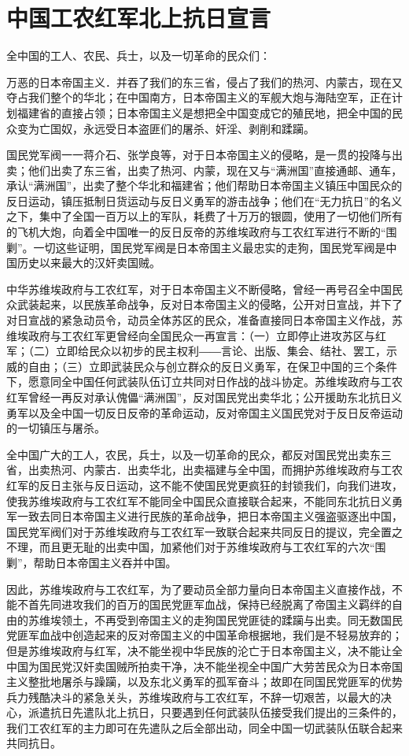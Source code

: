 \section[中国工农红军北上抗日宣言（一九三四年）]{中国工农红军北上抗日宣言}


全中国的工人、农民、兵士，以及一切革命的民众们：

万恶的日本帝国主义．并吞了我们的东三省，侵占了我们的热河、内蒙古，现在又夺占我们整个的华北；在中国南方，日本帝国主义的军舰大炮与海陆空军，正在计划福建省的直接占领；日本帝国主义是想把全中国变成它的殖民地，把全中国的民众变为亡国奴，永远受日本盗匪们的屠杀、奸淫、剥削和蹂躏。

国民党军阀一一蒋介石、张学良等，对于日本帝国主义的侵略，是一贯的投降与出卖；他们出卖了东三省，出卖了热河、内蒙，现在又与“满洲国”直接通邮、通车，承认“满洲国”，出卖了整个华北和福建省；他们帮助日本帝国主义镇压中国民众的反日运动，镇压抵制日货运动与反日义勇军的游击战争；他们在“无力抗日”的名义之下，集中了全国一百万以上的军队，耗费了十万万的银圆，使用了一切他们所有的飞机大炮，向着全中国唯一的反日反帝的苏维埃政府与工农红军进行不断的“围剿”。一切这些证明，国民党军阀是日本帝国主义最忠实的走狗，国民党军阀是中国历史以来最大的汉奸卖国贼。

中华苏维埃政府与工农红军，对于日本帝国主义不断侵略，曾经一再号召全中国民众武装起来，以民族革命战争，反对日本帝国主义的侵略，公开对日宣战，并下了对日宣战的紧急动员令，动员全体苏区的民众，准备直接同日本帝国主义作战，苏维埃政府与工农红军更曾经向全国民众一再宣言：（一）立即停止进攻苏区与红军；（二）立即给民众以初步的民主权利――言论、出版、集会、结社、罢工，示威的自由；（三）立即武装民众与创立群众的反日义勇军，在保卫中国的三个条件下，愿意同全中国任何武装队伍订立共同对日作战的战斗协定。苏维埃政府与工农红军曾经一再反对承认傀儡“满洲国”，反对国民党出卖华北；公开援助东北抗日义勇军以及全中国一切反日反帝的革命运动，反对帝国主义国民党对于反日反帝运动的一切镇压与屠杀。

全中国广大的工人，农民，兵士，以及一切革命的民众，都反对国民党出卖东三省，出卖热河、内蒙古．出卖华北，出卖福建与全中国，而拥护苏维埃政府与工农红军的反日主张与反日运动，这不能不使国民党更疯狂的封锁我们，向我们进攻，使我苏维埃政府与工农红军不能同全中国民众直接联合起来，不能同东北抗日义勇军一致去同日本帝国主义进行民族的革命战争，把日本帝国主义强盗驱逐出中国，国民党军阀们对于苏维埃政府与工农红军一致联合起来共同反日的提议，完全置之不理，而且更无耻的出卖中国，加紧他们对于苏维埃政府与工农红军的六次“围剿”，帮助日本帝国主义吞并中国。

因此，苏维埃政府与工农红军，为了要动员全部力量向日本帝国主义直接作战，不能不首先同进攻我们的百万的国民党匪军血战，保持已经脱离了帝国主义羁绊的自由的苏维埃领土，不再受到帝国主义的走狗国民党匪徒的蹂躏与出卖。同无数国民党匪军血战中创造起来的反对帝国主义的中国革命根据地，我们是不轻易放弃的；但是苏维埃政府与红军，决不能坐视中华民族的沦亡于日本帝国主义，决不能让全中国为国民党汉奸卖国贼所拍卖干净，决不能坐视全中国广大劳苦民众为日本帝国主义整批地屠杀与躁躏，以及东北义勇军的孤军奋斗；故即在同国民党匪军的优势兵力残酷决斗的紧急关头，苏维埃政府与工农红军，不辞一切艰苦，以最大的决心，派遣抗日先遣队北上抗日，只要遇到任何武装队伍接受我们提出的三条件的，我们工农红军的主力即可在先遣队之后全部出动，同全中国一切武装队伍联合起来共同抗日。


